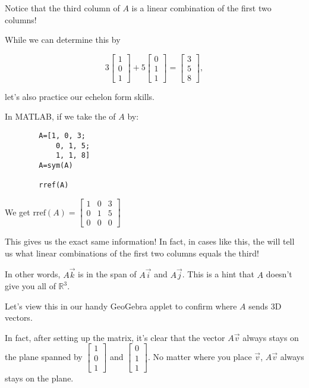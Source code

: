 \documentclass{ximera}
\begin{document}
\begin{remark}

    Notice that the third column of $A$ is a linear combination of the first two columns!

    While we can determine this by 
    
    \[3\begin{bmatrix}1\\0\\1\end{bmatrix}+5\begin{bmatrix}0\\1\\1\end{bmatrix}=\begin{bmatrix}3\\5\\8\end{bmatrix},\]

    let's also practice our echelon form skills. 

    In MATLAB, if we take the \rref of $A$ by:

    \begin{verbatim}
        A=[1, 0, 3;
            0, 1, 5;
            1, 1, 8]
        A=sym(A)

        rref(A)
    \end{verbatim}

    We get $\text{rref}(A)=\begin{bmatrix}1&0&3\\0&1&5\\0&0&0\end{bmatrix}$

    This gives us the exact same information! In fact, in cases like this, the \rref will tell us what linear combinations of the first two columns equals the third!
    
    In other words, $A\vec{k}$ is in the span of $A\vec{i}$ and $A\vec{j}$. This is a hint that $A$ doesn't give you all of $\mathbb{R}^3$. 

    Let's view this in our handy GeoGebra applet to confirm where $A$ sends 3D vectors.

    \begin{center}
    

    \end{center}

    In fact, after setting up the matrix, it's clear that the vector $A\vec{v}$ always stays on the plane spanned by $\begin{bmatrix}1\\0\\1\end{bmatrix}$ and $\begin{bmatrix}0\\1\\1\end{bmatrix}$. No matter where you place $\vec{v}$, $A\vec{v}$ always stays on the plane. 

\end{remark}
\end{document}
